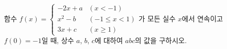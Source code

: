 함수 $f(x)=\begin{cases} -2x+a & (x<-1) \\ x^2-b & (-1\le x<1) \\ 3x+c & (x\ge 1) \end{cases}$가 모든 실수 $x$에서 연속이고 $f(0)=-1$일 때, 상수 $a$, $b$, $c$에 대하여 $abc$의 값을 구하시오.
